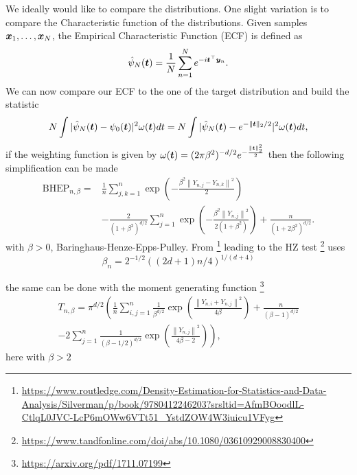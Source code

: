 We ideally would like to compare the distributions. One slight variation is to compare the Characteristic function of the distributions. Given samples ${\bm{x}}_1,\dots,{\bm{x}}_N$, the Empirical Characteristic Function (ECF) is defined as 
\begin{align*}
    \hat{\psi}_{N}({\bm{t}}) = \frac{1}{N}\sum_{n=1}^{N} e^{-i {\bm{t}}^\top {\bm{y}}_n}.
\end{align*}
We can now compare our ECF to the one of the target distribution and build the statistic
\begin{align*}
    N\int |\hat{\psi}_{N}({\bm{t}}) - \psi_{0}({\bm{t}}) |^2\omega({\bm{t}}) dt=N\int |\hat{\psi}_{N}({\bm{t}}) - e^{-\|{\bm{t}}\|_2/2} |^2\omega({\bm{t}}) dt,
\end{align*}
if the weighting function is given by $\omega({\bm{t}}) = (2\pi \beta ^2 )^{-d/2}e^{-\frac{\|{\bm{t}}\|_2^2}{2}}$ then the following simplification can be made
\begin{align*}
\mathrm{BHEP}_{n, \beta}= & \frac{1}{n} \sum_{j, k=1}^{n} \exp \left(-\frac{\beta^{2}\left\|Y_{n, j}-Y_{n, k}\right\|^{2}}{2}\right) \\
& -\frac{2}{\left(1+\beta^{2}\right)^{d / 2}} \sum_{j=1}^{n} \exp \left(-\frac{\beta^{2}\left\|Y_{n, j}\right\|^{2}}{2\left(1+\beta^{2}\right)}\right)+\frac{n}{\left(1+2 \beta^{2}\right)^{d / 2}} .
\end{align*}
with $\beta>0$, Baringhaus-Henze-Epps-Pulley. From \footnote{\url{https://www.routledge.com/Density-Estimation-for-Statistics-and-Data-Analysis/Silverman/p/book/9780412246203?srsltid=AfmBOoodlL-CtlqL0JVC-LcP6mOWw6VTt51_YstdZOW4W3iuicu1VFyg}}
leading to the HZ test \footnote{\url{https://www.tandfonline.com/doi/abs/10.1080/03610929008830400}} uses
\begin{equation}
    \beta_{n}=2^{-1 / 2}((2 d+1) n / 4)^{1 /(d+4)}
\end{equation}




the same can be done with the moment generating function \footnote{\url{https://arxiv.org/pdf/1711.07199}}
\begin{align*}
T_{n, \beta}=\pi^{d / 2}\left(\frac{1}{n} \sum_{i, j=1}^{n} \frac{1}{\beta^{d / 2}} \exp \left(\frac{\left\|Y_{n, i}+Y_{n, j}\right\|^{2}}{4 \beta}\right)+\frac{n}{(\beta-1)^{d / 2}}\right. \\
\left.-2 \sum_{j=1}^{n} \frac{1}{(\beta-1 / 2)^{d / 2}} \exp \left(\frac{\left\|Y_{n, j}\right\|^{2}}{4 \beta-2}\right)\right),
\end{align*}
here with $\beta>2$

